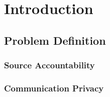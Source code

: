 
\chapter{Introduction} %

\label{intro} %

\section{Problem Definition}

\subsection{Source Accountability}

\subsection{Communication Privacy}